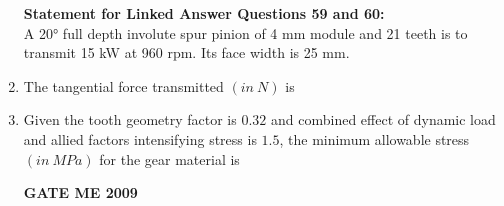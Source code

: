 \documentclass[journal]{IEEEtran}
\begin{document}
\begin{enumerate}[leftmargin=0pt]
\textbf{Statement for Linked Answer Questions 59 and 60:}\\
A 20° full depth involute spur pinion of 4 mm module and 21 teeth is to transmit 15 kW at 960 rpm. Its face width is 25 mm.
\item The tangential force transmitted $(in\  N)$ is
\begin{enumerate}
\end{enumerate}

\item Given the tooth geometry factor is $0.32$ and combined effect of dynamic load and allied factors intensifying stress is $1.5$, the minimum allowable stress $(in\  MPa)$ for the gear material is
\begin{enumerate}
\hfill{\textbf{GATE ME 2009}}
\end{enumerate}



\end{enumerate}
\end{document}
